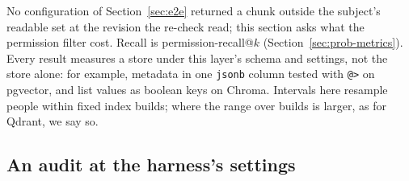 
No configuration of Section~\ref{sec:e2e} returned a chunk outside the subject's readable set at the
revision the re-check read; this section asks what the permission filter cost. Recall is
permission-recall@$k$ (Section~\ref{sec:prob-metrics}). Every result measures a store under this layer's
schema and settings, not the store alone: for example, metadata in one \texttt{jsonb} column tested with
\texttt{@>} on pgvector, and list values as boolean keys on Chroma. Intervals here resample people within fixed index builds;
where the range over builds is larger, as for Qdrant, we say so.

\subsection{An audit at the harness's settings}\label{sec:qual-audit}

